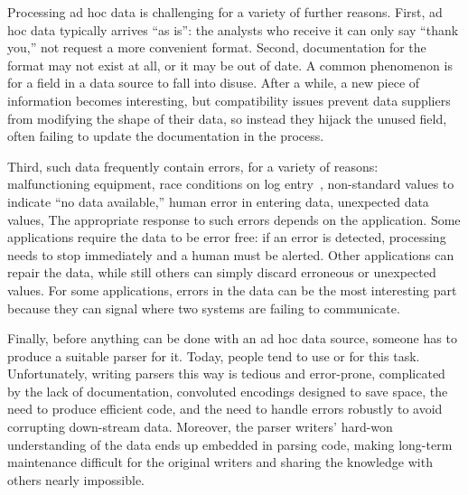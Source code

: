 \documentclass[11pt]{article}
\begin{document}
Processing ad hoc data is challenging for a variety of further reasons. 
First, ad hoc data typically arrives ``as is'': the analysts
who receive it can only say ``thank you,'' not request a more
convenient format.  Second, documentation for the format may not exist
at all, or it may be out of date.  A common phenomenon is for a field
in a data source to fall into disuse.  After a while, a new piece of
information becomes interesting, but compatibility issues prevent data
suppliers from modifying the shape of their data, so instead they
hijack the unused field, often failing to update the documentation in
the process.

Third, such data frequently contain errors, for a variety of reasons:
malfunctioning equipment, race conditions on log entry~\cite{wpp},
non-standard values to indicate ``no data available,'' human error in
entering data, unexpected data values, \etc{} The appropriate response
to such errors depends on the application.  Some applications require
the data to be error free: if an error is detected, processing needs
to stop immediately and a human must be alerted.  Other applications
can repair the data, while still others can simply discard erroneous
or unexpected values.  For some applications, errors in the data can
be the most interesting part because they can signal where two systems
are failing to communicate.


Finally, before anything can be done with an ad hoc data source,
someone has to produce a suitable parser for it.  Today, people tend
to use \C{} or \perl{} for this task.  Unfortunately, writing parsers
this way is tedious and error-prone, complicated by the lack of
documentation, convoluted encodings designed to save space, the need
to produce efficient code, and the need to handle errors robustly to
avoid corrupting down-stream data.  Moreover, the parser writers'
hard-won understanding of the data ends up embedded in parsing code,
making long-term maintenance difficult for the original writers and
sharing the knowledge with others nearly impossible.
\end{document}
